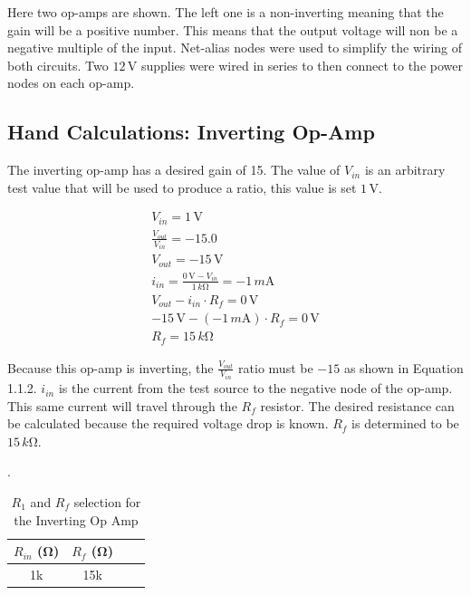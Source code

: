 \documentclass[11pt]{article}
\begin{document}

Here two op-amps are shown. The left one is a non-inverting meaning that the gain will be a positive number. This means that the output voltage will non be a negative multiple of the input. Net-alias nodes were used to simplify the wiring of both circuits. Two $12\,\si\volt$ supplies were wired in series to then connect to the power nodes on each op-amp.

\subsection{Hand Calculations: Inverting Op-Amp}

The inverting op-amp has a desired gain of 15. The value of $V_{in}$ is an arbitrary test value that will be used to produce a ratio, this value is set $1\,\si\volt$.

\begin{align}
\label{eq:non}
V_{in} = 1\,\si\volt\\
\frac{V_{out}}{V_{in}} = -15.0\\
V_{out} = -15\,\si\volt\\
i_{in} = \frac{0\,\si\volt - V_{in}}{1\,k\si\ohm} = -1\,m\si\ampere\\
V_{out} - i_{in} \cdot R_f = 0\,\si\volt\\
-15\,\si\volt - (-1\,m\si\ampere) \cdot R_f = 0\,\si\volt\\
R_f = 15\,k\si\ohm
\end{align}

Because this op-amp is inverting, the $\frac{V_{out}}{V_{in}}$ ratio must be $-15$ as shown in Equation 1.1.2. $i_{in}$ is the current from the test source to the negative node of the op-amp. This same current will travel through the $R_f$ resistor. The desired resistance can be calculated because the required voltage drop is known. $R_f$ is determined to be $15\,k\si\ohm$.

\begin{table}[h]
	\centering
	\caption{$R_1$ and $R_f$ selection  for the Inverting Op Amp}.
	\label{Table:Lab4InvertingOpAmpSelection}
	\begin{tabular}{|c|c|c|c|}
		\hline
		$R_{in}$ (\si{\ohm})& %
		$R_{f}$ (\si{\ohm}) \\
		\hline
		1k & 15k \\	 \hline 
	\end{tabular}
\end{table}
\end{document}
